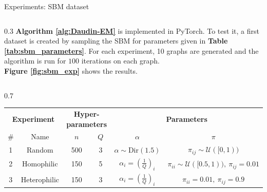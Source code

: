 \documentclass[final]{beamer}
\newlength{\colwidth}
\begin{document}
\begin{frame}[t]
\begin{columns}[t]
\begin{column}{\colwidth}
      \begin{block}{Experiments: SBM dataset}
        \begin{column}{0.3\colwidth}
          \justifying
          \textbf{Algorithm \ref{alg:Daudin-EM}} is implemented in PyTorch.
          To test it, a first dataset is created by sampling the SBM for parameters given in \textbf{Table \ref{tab:sbm_parameters}}. For each experiment, 10 graphs are generated and the algorithm is run for $100$ iterations on each graph.\\[0.5em]
          \textbf{Figure \ref{fig:sbm_exp}} shows the results.
        \end{column}
        \begin{column}{0.7\colwidth}
          \begin{table}[ht]
            \centering
            \small
            \setlength\heavyrulewidth{0.25ex}
            \begin{tabular}{@{}cccccc@{}}
              \toprule
              \multicolumn{2}{c}{\textbf{Experiment}} & \multicolumn{2}{c}{\textbf{Hyper-parameters}} & \multicolumn{2}{c}{\textbf{Parameters}}                                                                                                                                      \\
              \#                                      & Name                                          & \hspace{1em} $n$                        & $Q$                    & $\alpha$                                  & $\pi$                                                         \\ \midrule \midrule
              1                                       & \multicolumn{1}{c|}{Random}                   & \hspace{1em} 500                        & \multicolumn{1}{c|}{3} & $\alpha \sim \text{Dir}(1.5)$             & $\pi_{ij} \sim \mathcal{U}([0, 1))$                           \\
              2                                       & \multicolumn{1}{c|}{Homophilic}               & \hspace{1em} 150                        & \multicolumn{1}{c|}{5} & $\alpha_i = (\frac{1}{Q})_i$              & $\pi_{ii} \sim \mathcal{U}([0.5, 1)), \ \pi_{ij} = 0.01$      \\
              3                                       & \multicolumn{1}{c|}{Heterophilic}             & \hspace{1em} 150                        & \multicolumn{1}{c|}{3} & $\alpha_i = (\frac{1}{Q})_i$              & $\pi_{ii} = 0.01, \ \pi_{ij} = 0.9$                           \\

\end{tabular}
\end{table}
\end{column}
\end{block}
\end{column}
\end{columns}
\end{frame}
\end{document}
